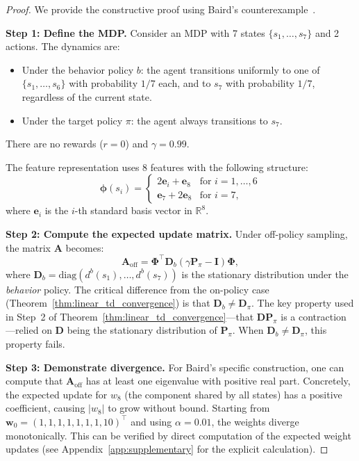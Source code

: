 \documentclass[11pt,a4paper]{article}
\theoremstyle{definition}
\theoremstyle{plain}
\theoremstyle{remark}
\newcommand{\R}{\mathbb{R}}
\begin{document}
\begin{proof}
We provide the constructive proof using Baird's counterexample~\cite{baird1995}.

\textbf{Step 1: Define the MDP.} Consider an MDP with 7 states $\{s_1, \ldots, s_7\}$ and 2 actions. The dynamics are:
\begin{itemize}[nosep]
    \item Under the behavior policy $b$: the agent transitions uniformly to one of $\{s_1, \ldots, s_6\}$ with probability $1/7$ each, and to $s_7$ with probability $1/7$, regardless of the current state.
    \item Under the target policy $\pi$: the agent always transitions to $s_7$.
\end{itemize}
There are no rewards ($r = 0$) and $\gamma = 0.99$.

The feature representation uses 8 features with the following structure:
\begin{equation}
    \bm{\phi}(s_i) = \begin{cases} 2\bm{e}_i + \bm{e}_8 & \text{for } i = 1,\ldots,6 \\ \bm{e}_7 + 2\bm{e}_8 & \text{for } i = 7, \end{cases}
    \label{eq:baird_features}
\end{equation}
where $\bm{e}_i$ is the $i$-th standard basis vector in $\R^8$.

\textbf{Step 2: Compute the expected update matrix.} Under off-policy sampling, the matrix $\bm{A}$ becomes:
\begin{equation}
    \bm{A}_{\text{off}} = \bm{\Phi}^\top \bm{D}_b(\gamma \bm{P}_\pi - \bm{I})\bm{\Phi},
    \label{eq:A_off_policy}
\end{equation}
where $\bm{D}_b = \text{diag}(d^b(s_1), \ldots, d^b(s_7))$ is the stationary distribution under the \emph{behavior} policy. The critical difference from the on-policy case (Theorem~\ref{thm:linear_td_convergence}) is that $\bm{D}_b \neq \bm{D}_\pi$. The key property used in Step~2 of Theorem~\ref{thm:linear_td_convergence}---that $\bm{D}\bm{P}_\pi$ is a contraction---relied on $\bm{D}$ being the stationary distribution of $\bm{P}_\pi$. When $\bm{D}_b \neq \bm{D}_\pi$, this property fails.

\textbf{Step 3: Demonstrate divergence.} For Baird's specific construction, one can compute that $\bm{A}_{\text{off}}$ has at least one eigenvalue with positive real part. Concretely, the expected update for $w_8$ (the component shared by all states) has a positive coefficient, causing $|w_8|$ to grow without bound. Starting from $\bm{w}_0 = (1,1,1,1,1,1,1,10)^\top$ and using $\alpha = 0.01$, the weights diverge monotonically. This can be verified by direct computation of the expected weight updates (see Appendix~\ref{app:supplementary} for the explicit calculation).
\end{proof}
\end{document}

